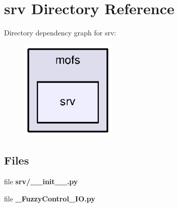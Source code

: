 \section{srv Directory Reference}
\label{dir_f8a3cb235794fd55d99a7148e9ca20a7}
Directory dependency graph for srv\-:\nopagebreak
\begin{figure}[H]
\begin{center}
\leavevmode
\includegraphics[width=130pt]{dir_f8a3cb235794fd55d99a7148e9ca20a7_dep}
\end{center}
\end{figure}
\subsection*{Files}
\begin{DoxyCompactItemize}
\item 
file {\bf srv/\-\_\-\-\_\-init\-\_\-\-\_\-.\-py}
\item 
file {\bf \-\_\-\-Fuzzy\-Control\-\_\-\-I\-O.\-py}
\end{DoxyCompactItemize}
